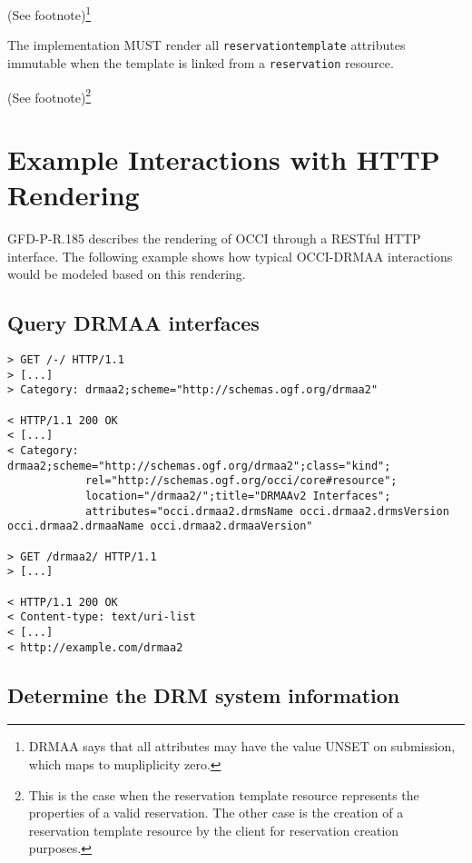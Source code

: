 \documentclass[10pt]{article}
\newcommand{\h}[1]{\lstinline|#1|}
\newcommand{\rat}[1]{ {\tiny(See footnote)}\footnote{#1} }
\begin{document}
\rat{DRMAA says that all attributes may have the value UNSET on submission, which maps to mupliplicity zero.}

The implementation MUST render all \h{reservationtemplate} attributes immutable when the template is linked from a \h{reservation} resource.

\rat{This is the case when the reservation template resource represents the properties of a valid reservation. The other case is the creation of a reservation template resource by the client for reservation creation purposes.}



\section{Example Interactions with HTTP Rendering}


GFD-P-R.185 \cite{gfd185} describes the rendering of OCCI through a RESTful HTTP interface. The following example shows how typical OCCI-DRMAA interactions would be modeled based on this rendering.

\subsection{Query DRMAA interfaces}

\begin{verbatim}
> GET /-/ HTTP/1.1
> [...]
> Category: drmaa2;scheme="http://schemas.ogf.org/drmaa2" 

< HTTP/1.1 200 OK 
< [...]
< Category: drmaa2;scheme="http://schemas.ogf.org/drmaa2";class="kind";
			rel="http://schemas.ogf.org/occi/core#resource";
            location="/drmaa2/";title="DRMAAv2 Interfaces";
            attributes="occi.drmaa2.drmsName occi.drmaa2.drmsVersion occi.drmaa2.drmaaName occi.drmaa2.drmaaVersion"

> GET /drmaa2/ HTTP/1.1
> [...]

< HTTP/1.1 200 OK 
< Content-type: text/uri-list
< [...]
< http://example.com/drmaa2
\end{verbatim}


\subsection{Determine the DRM system information}
             
\end{document}
